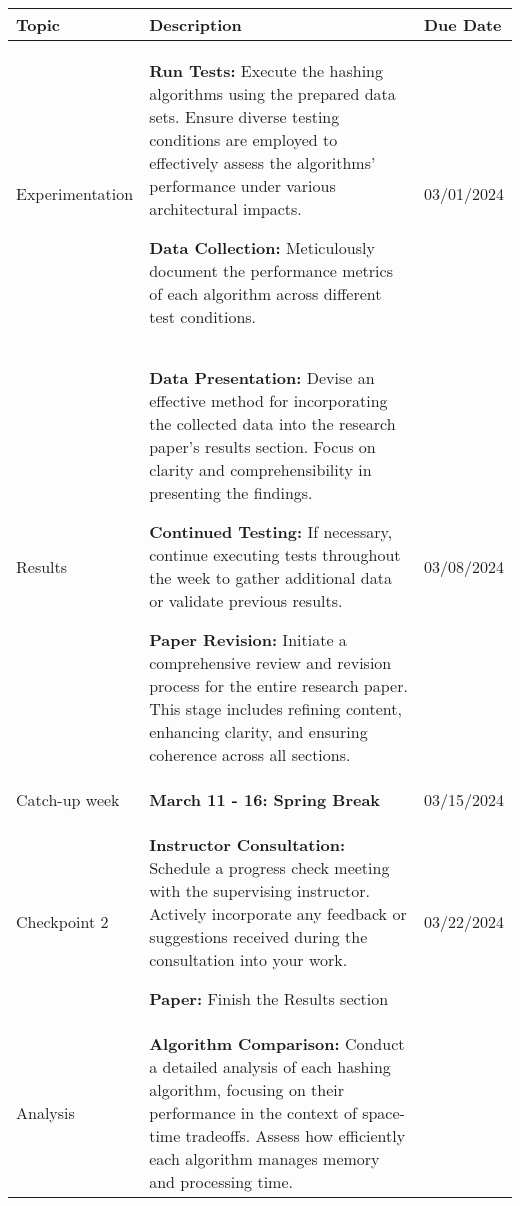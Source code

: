 \documentclass[11pt]{article}
\begin{document}
\begin{table}[h!]
    \centering
        \begin{tabular}{ | m{3cm} | m{10cm}| m{2cm} | }
        \hline
        \textbf{Topic} & \textbf{Description} & \textbf{ Due Date} \\

        \hline
        Experimentation & 
            \textbf{Run Tests:} Execute the hashing algorithms using the prepared data sets. Ensure diverse testing conditions are employed to effectively assess the algorithms' performance under various architectural impacts.
    
            \textbf{Data Collection:} Meticulously document the performance metrics of each algorithm across different test conditions.
        & 03/01/2024 \\

        \hline
         Results &
            \textbf{Data Presentation:} Devise an effective method for incorporating the collected data into the research paper's results section. Focus on clarity and comprehensibility in presenting the findings.
    
            \textbf{Continued Testing:} If necessary, continue executing tests throughout the week to gather additional data or validate previous results.
            
            \textbf{Paper Revision:} Initiate a comprehensive review and revision process for the entire research paper. This stage includes refining content, enhancing clarity, and ensuring coherence across all sections.
        & 03/08/2024 \\

        \hline
        Catch-up week & 
        \textbf{March 11 - 16:	Spring Break}
        & 03/15/2024 \\

        \hline
        Checkpoint 2 & 
            \textbf{Instructor Consultation:} Schedule a progress check meeting with the supervising instructor. Actively incorporate any feedback or suggestions received during the consultation into your work.
            
            \textbf{Paper:} Finish the Results section
        & 03/22/2024 \\

        \hline
        Analysis &
            \textbf{Algorithm Comparison:} Conduct a detailed analysis of each hashing algorithm, focusing on their performance in the context of space-time tradeoffs. Assess how efficiently each algorithm manages memory and processing time.
            

\end{tabular}
\end{table}
\end{document}
